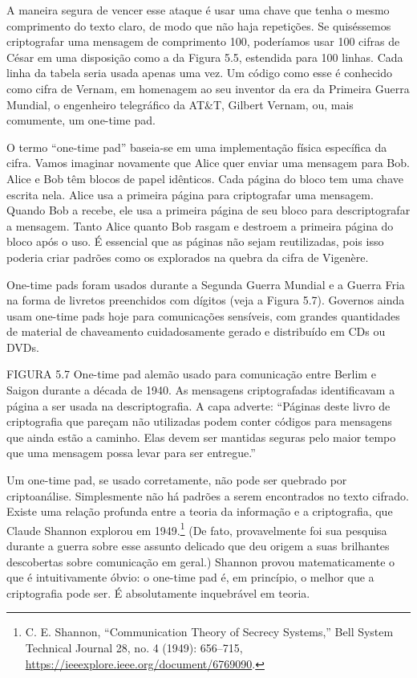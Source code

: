 \documentclass{book}
\begin{document}
A maneira segura de vencer esse ataque é usar uma chave que tenha o mesmo comprimento do texto claro, de modo que não haja repetições. Se quiséssemos criptografar uma mensagem de comprimento 100, poderíamos usar 100 cifras de César em uma disposição como a da Figura 5.5, estendida para 100 linhas. Cada linha da tabela seria usada apenas uma vez. Um código como esse é conhecido como cifra de Vernam, em homenagem ao seu inventor da era da Primeira Guerra Mundial, o engenheiro telegráfico da AT\&T, Gilbert Vernam, ou, mais comumente, um one-time pad.

O termo ``one-time pad'' baseia-se em uma implementação física específica da cifra. Vamos imaginar novamente que Alice quer enviar uma mensagem para Bob. Alice e Bob têm blocos de papel idênticos. Cada página do bloco tem uma chave escrita nela. Alice usa a primeira página para criptografar uma mensagem. Quando Bob a recebe, ele usa a primeira página de seu bloco para descriptografar a mensagem. Tanto Alice quanto Bob rasgam e destroem a primeira página do bloco após o uso. É essencial que as páginas não sejam reutilizadas, pois isso poderia criar padrões como os explorados na quebra da cifra de Vigenère.

One-time pads foram usados durante a Segunda Guerra Mundial e a Guerra Fria na forma de livretos preenchidos com dígitos (veja a Figura 5.7). Governos ainda usam one-time pads hoje para comunicações sensíveis, com grandes quantidades de material de chaveamento cuidadosamente gerado e distribuído em CDs ou DVDs.

FIGURA 5.7 One-time pad alemão usado para comunicação entre Berlim e Saigon durante a década de 1940. As mensagens criptografadas identificavam a página a ser usada na descriptografia. A capa adverte: ``Páginas deste livro de criptografia que pareçam não utilizadas podem conter códigos para mensagens que ainda estão a caminho. Elas devem ser mantidas seguras pelo maior tempo que uma mensagem possa levar para ser entregue.''

Um one-time pad, se usado corretamente, não pode ser quebrado por criptoanálise. Simplesmente não há padrões a serem encontrados no texto cifrado. Existe uma relação profunda entre a teoria da informação e a criptografia, que Claude Shannon explorou em 1949.\footnote{C. E. Shannon, “Communication Theory of Secrecy Systems,” Bell System Technical Journal 28, no. 4 (1949): 656–715, \url{https://ieeexplore.ieee.org/document/6769090}.} (De fato, provavelmente foi sua pesquisa durante a guerra sobre esse assunto delicado que deu origem a suas brilhantes descobertas sobre comunicação em geral.) Shannon provou matematicamente o que é intuitivamente óbvio: o one-time pad é, em princípio, o melhor que a criptografia pode ser. É absolutamente inquebrável em teoria.
\end{document}
